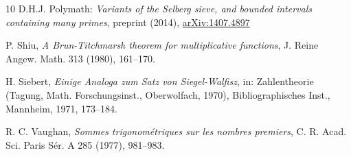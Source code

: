 \documentclass[12pt,a4paper,reqno]{amsart}
\numberwithin{equation}{section}
\theoremstyle{plain}
\theoremstyle{definition}
\begin{document}
\begin{thebibliography}{10}
 D.H.J. Polymath: \emph{Variants of the Selberg sieve,
    and bounded intervals containing many primes}, preprint (2014),
  \url{arXiv:1407.4897}






 P. Shiu, \emph{A Brun-Titchmarsh theorem for
    multiplicative functions}, J. Reine Angew.  Math. 313 (1980),
  161--170.

 H. Siebert, \emph{Einige Analoga zum Satz von
    Siegel-Walfisz}, in: Zahlentheorie (Tagung, Math. Forschungsinst.,
  Oberwolfach, 1970), Bibliographisches Inst., Mannheim, 1971,
  173--184.




 R. C. Vaughan, \emph{Sommes trigonom\'etriques sur
    les nombres premiers}, C. R. Acad. Sci. Paris S\'er. A 285 (1977),
  981--983.



\end{thebibliography}
\end{document}
